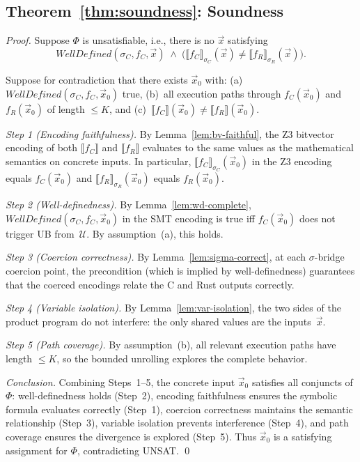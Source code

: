 \documentclass[10pt,a4paper]{article}
\begin{document}
\begin{appendices}
\subsection{Theorem~\ref{thm:soundness}: Soundness}

\begin{proof}
Suppose $\Phi$ is unsatisfiable, i.e., there is no $\vec{x}$
satisfying
\[
\mathit{WellDefined}(\sigma_C, f_C, \vec{x}) \;\wedge\;
\bigl(\llbracket f_C \rrbracket_{\sigma_C}(\vec{x}) \neq
\llbracket f_R \rrbracket_{\sigma_R}(\vec{x})\bigr).
\]

Suppose for contradiction that there exists $\vec{x}_0$ with:
(a)~$\mathit{WellDefined}(\sigma_C, f_C, \vec{x}_0)$ true,
(b)~all execution paths through $f_C(\vec{x}_0)$ and
$f_R(\vec{x}_0)$ of length $\leq K$, and
(c)~$\llbracket f_C \rrbracket(\vec{x}_0) \neq
\llbracket f_R \rrbracket(\vec{x}_0)$.

\emph{Step 1 (Encoding faithfulness).}
By Lemma~\ref{lem:bv-faithful}, the Z3 bitvector encoding of both
$\llbracket f_C \rrbracket$ and $\llbracket f_R \rrbracket$
evaluates to the same values as the mathematical semantics on
concrete inputs.  In particular,
$\llbracket f_C \rrbracket_{\sigma_C}(\vec{x}_0)$ in the Z3
encoding equals $f_C(\vec{x}_0)$ and
$\llbracket f_R \rrbracket_{\sigma_R}(\vec{x}_0)$ equals
$f_R(\vec{x}_0)$.

\emph{Step 2 (Well-definedness).}
By Lemma~\ref{lem:wd-complete},
$\mathit{WellDefined}(\sigma_C, f_C, \vec{x}_0)$ in the SMT encoding
is true iff $f_C(\vec{x}_0)$ does not trigger UB
from~$\mathcal{U}$.  By assumption~(a), this holds.

\emph{Step 3 (Coercion correctness).}
By Lemma~\ref{lem:sigma-correct}, at each $\sigma$-bridge coercion
point, the precondition (which is implied by well-definedness)
guarantees that the coerced encodings relate the C and Rust outputs
correctly.

\emph{Step 4 (Variable isolation).}
By Lemma~\ref{lem:var-isolation}, the two sides of the product
program do not interfere: the only shared values are the
inputs~$\vec{x}$.

\emph{Step 5 (Path coverage).}
By assumption~(b), all relevant execution paths have length $\leq K$,
so the bounded unrolling explores the complete behavior.

\emph{Conclusion.}
Combining Steps~1--5, the concrete input $\vec{x}_0$ satisfies all
conjuncts of $\Phi$: well-definedness holds (Step~2), encoding
faithfulness ensures the symbolic formula evaluates correctly
(Step~1), coercion correctness maintains the semantic relationship
(Step~3), variable isolation prevents interference (Step~4), and
path coverage ensures the divergence is explored (Step~5).  Thus
$\vec{x}_0$ is a satisfying assignment for $\Phi$, contradicting
UNSAT.  \qed
\end{proof}


\end{appendices}
\end{document}
